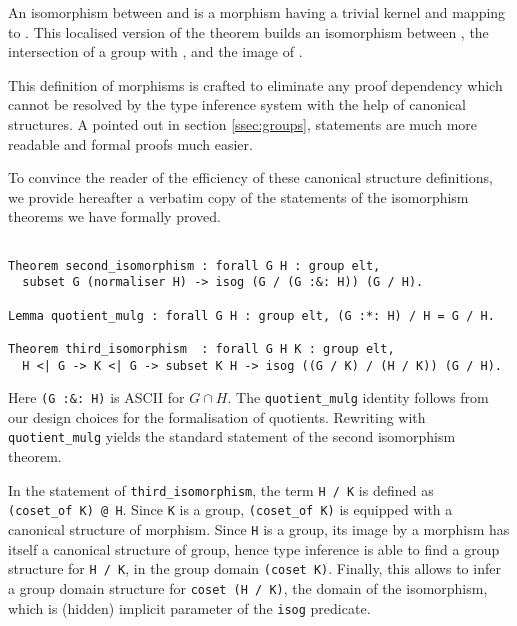 An isomorphism between  and  is a morphism having
a trivial kernel and mapping  to . This localised version
of the theorem builds an isomorphism between , the
intersection of a group  with , and the image 
of .


This definition of morphisms is crafted to eliminate 
any proof dependency which cannot be resolved by the type inference
system with the help of canonical structures.
A pointed out in section \ref{ssec:groups}, statements are much more
readable and formal proofs much easier.

To convince the reader of the efficiency of these canonical structure
definitions, we provide hereafter a verbatim copy of the statements of the
isomorphism theorems we have formally proved.

{\small \begin{verbatim}

Theorem second_isomorphism : forall G H : group elt,
  subset G (normaliser H) -> isog (G / (G :&: H)) (G / H).

Lemma quotient_mulg : forall G H : group elt, (G :*: H) / H = G / H.

Theorem third_isomorphism  : forall G H K : group elt,
  H <| G -> K <| G -> subset K H -> isog ((G / K) / (H / K)) (G / H).
\end{verbatim}
}

Here \verb+(G :&: H)+ is ASCII for $G \cap H$. The \verb+quotient_mulg+
identity follows from our design choices for the
formalisation of quotients. Rewriting with \\ \verb+quotient_mulg+
yields the standard statement of the second isomorphism theorem.

In the statement of \verb+third_isomorphism+, the term \verb+H / K+
is defined as \\ \verb+(coset_of K) @ H+. Since \verb+K+ is a
group, \verb+(coset_of K)+ is equipped with a canonical structure of
morphism. Since \verb+H+ is a group, its image by a morphism has itself a
canonical structure of group, hence type inference is able to
find a group structure for \verb+H / K+, in the group domain
\verb+(coset K)+. Finally, this allows \Coq{} to infer a group domain
structure for \verb+coset (H / K)+, the domain of the isomorphism,
which is (hidden) implicit parameter of the \verb+isog+ predicate.
